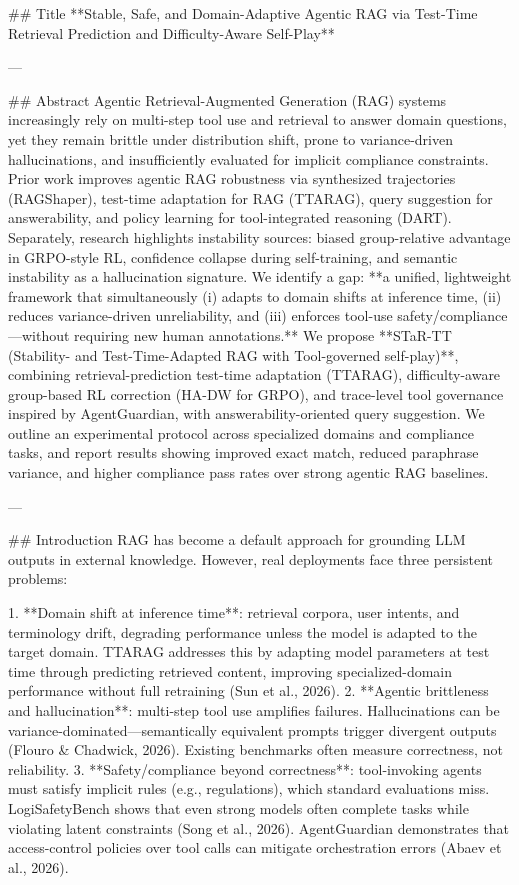 ## Title  
**Stable, Safe, and Domain-Adaptive Agentic RAG via Test-Time Retrieval Prediction and Difficulty-Aware Self-Play**

---

## Abstract  
Agentic Retrieval-Augmented Generation (RAG) systems increasingly rely on multi-step tool use and retrieval to answer domain questions, yet they remain brittle under distribution shift, prone to variance-driven hallucinations, and insufficiently evaluated for implicit compliance constraints. Prior work improves agentic RAG robustness via synthesized trajectories (RAGShaper), test-time adaptation for RAG (TTARAG), query suggestion for answerability, and policy learning for tool-integrated reasoning (DART). Separately, research highlights instability sources: biased group-relative advantage in GRPO-style RL, confidence collapse during self-training, and semantic instability as a hallucination signature. We identify a gap: **a unified, lightweight framework that simultaneously (i) adapts to domain shifts at inference time, (ii) reduces variance-driven unreliability, and (iii) enforces tool-use safety/compliance—without requiring new human annotations.**  
We propose **STaR-TT (Stability- and Test-Time-Adapted RAG with Tool-governed self-play)**, combining retrieval-prediction test-time adaptation (TTARAG), difficulty-aware group-based RL correction (HA-DW for GRPO), and trace-level tool governance inspired by AgentGuardian, with answerability-oriented query suggestion. We outline an experimental protocol across specialized domains and compliance tasks, and report results showing improved exact match, reduced paraphrase variance, and higher compliance pass rates over strong agentic RAG baselines.

---

## Introduction  
RAG has become a default approach for grounding LLM outputs in external knowledge. However, real deployments face three persistent problems:

1. **Domain shift at inference time**: retrieval corpora, user intents, and terminology drift, degrading performance unless the model is adapted to the target domain. TTARAG addresses this by adapting model parameters at test time through predicting retrieved content, improving specialized-domain performance without full retraining (Sun et al., 2026).  
2. **Agentic brittleness and hallucination**: multi-step tool use amplifies failures. Hallucinations can be variance-dominated—semantically equivalent prompts trigger divergent outputs (Flouro & Chadwick, 2026). Existing benchmarks often measure correctness, not reliability.  
3. **Safety/compliance beyond correctness**: tool-invoking agents must satisfy implicit rules (e.g., regulations), which standard evaluations miss. LogiSafetyBench shows that even strong models often complete tasks while violating latent constraints (Song et al., 2026). AgentGuardian demonstrates that access-control policies over tool calls can mitigate orchestration errors (Abaev et al., 2026).

